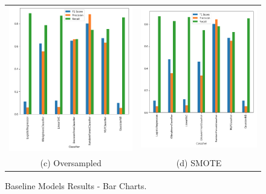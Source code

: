 \documentclass[12pt,a4paper,twoside]{report}
\begin{document}
\begin{figure}[!htbp]
\begin{tabular}{cc}
 \includegraphics[width=80mm]{baseline-results-over} &   \includegraphics[width=80mm]{baseline-results-smote} \\
(c) Oversampled & (d) SMOTE \\[6pt]

\end{tabular}
\caption{Baseline Models Results - Bar Charts.}
\label{figure:baseline-results-charts}
\end{figure}
\end{document}
